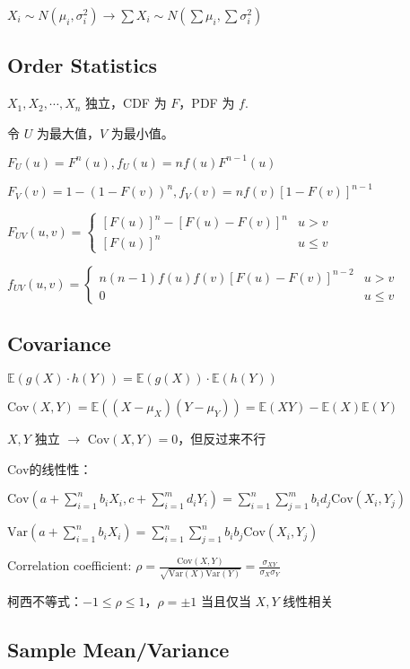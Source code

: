 \documentclass[9pt,landscape]{article}
\begin{document}
\begin{multicols}{3}
$X_i\sim N(\mu_i,\sigma_i^2)\to \sum X_i\sim N(\sum\mu_i,\sum\sigma_i^2)$

\subsection{Order Statistics}

$X_1, X_2, \cdots, X_n$ 独立，CDF 为 $F$，PDF 为 $f$.

令 $U$ 为最大值，$V$ 为最小值。

$F_U(u)=F^n(u), f_U(u)=nf(u)F^{n-1}(u)$ 

$F_V(v)=1-\left(1-F(v)\right)^n, f_V(v)=nf(v)\left[1-F(v)\right]^{n-1}$

$F_{UV}(u, v)=\begin{cases}
	\left[F(u)\right]^n-\left[F(u)-F(v)\right]^{n}&u>v\\
	\left[F(u)\right]^n&u\le v
\end{cases}$

$f_{UV}(u, v)=\begin{cases}
	n(n-1)f(u)f(v)\left[F(u)-F(v)\right]^{n-2}&u> v\\
	0&u\le v
\end{cases}$

\subsection{Covariance}

$\mathbb{E}(g(X)\cdot h(Y))=\mathbb{E}(g(X))\cdot \mathbb{E}(h(Y))$

$\mathrm{Cov}(X, Y)=\mathbb{E}((X-\mu_X)(Y-\mu_Y))=\mathbb{E}(XY)-\mathbb{E}(X)\mathbb{E}(Y)$

$X, Y$ 独立 $\to$ $\mathrm{Cov}(X, Y)=0$，但反过来不行

$\mathrm{Cov}$的线性性：

$\mathrm{Cov}\left(a+\sum_{i=1}^{n}b_iX_i, c+\sum_{i=1}^{m}d_iY_i\right)=\sum_{i=1}^{n}\sum_{j=1}^{m}b_id_j\mathrm{Cov}(X_i, Y_j)$

$\mathrm{Var}\left(a+\sum_{i=1}^{n}b_iX_i\right)=\sum_{i=1}^{n}\sum_{j=1}^{n}b_ib_j\mathrm{Cov}(X_i, Y_j)$

Correlation coefficient: $\rho=\frac{\mathrm{Cov}(X, Y)}{\sqrt{\mathrm{Var}(X)\mathrm{Var}(Y)}}=\frac{\sigma_{XY}}{\sigma_X\sigma_Y}$

柯西不等式：$-1\le\rho\le 1$，$\rho=\pm 1$ 当且仅当 $X, Y$ 线性相关

\subsection{Sample Mean/Variance}


\end{multicols}
\end{document}
